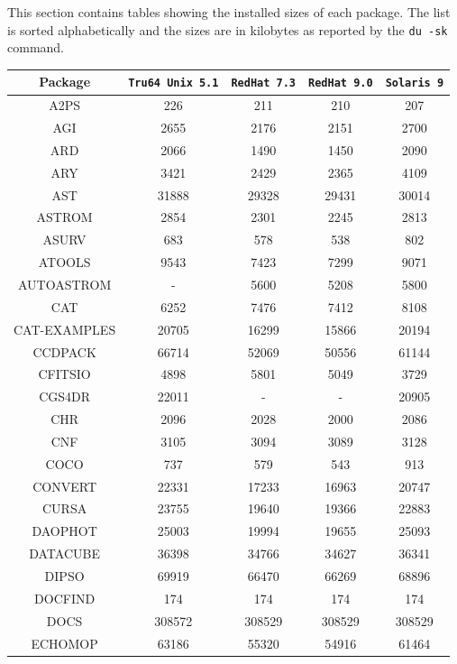 \documentclass[twoside,11pt]{article}
\renewcommand{\_}{\texttt{\symbol{95}}}
\begin{document}
This section contains tables showing the installed sizes of each
package.  The list is sorted alphabetically and the sizes are in
kilobytes as reported by the \texttt{du -sk} command.

\vspace*{10mm}

\begin{table}[ht]
\begin{center}
\begin{tabular}{|c|c|c|c|c|}
\hline \hline
\textbf{Package} & \texttt{Tru64 Unix 5.1} & \texttt{RedHat 7.3} & \texttt{RedHat 9.0} & \texttt{Solaris 9} \\ \hline \hline 
A2PS & 226 & 211 & 210 & 207 \\ 
AGI & 2655 & 2176 & 2151 & 2700 \\ 
ARD & 2066 & 1490 & 1450 & 2090 \\ 
ARY & 3421 & 2429 & 2365 & 4109 \\ 
AST & 31888 & 29328 & 29431 & 30014 \\ 
ASTROM & 2854 & 2301 & 2245 & 2813 \\ 
ASURV & 683 & 578 & 538 & 802 \\ 
ATOOLS & 9543 & 7423 & 7299 & 9071 \\ 
AUTOASTROM & - & 5600 & 5208 & 5800 \\ 
CAT & 6252 & 7476 & 7412 & 8108 \\ 
CAT-EXAMPLES & 20705 & 16299 & 15866 & 20194 \\ 
CCDPACK & 66714 & 52069 & 50556 & 61144 \\ 
CFITSIO & 4898 & 5801 & 5049 & 3729 \\ 
CGS4DR & 22011 & - & - & 20905 \\ 
CHR & 2096 & 2028 & 2000 & 2086 \\ 
CNF & 3105 & 3094 & 3089 & 3128 \\ 
COCO & 737 & 579 & 543 & 913 \\ 
CONVERT & 22331 & 17233 & 16963 & 20747 \\ 
CURSA & 23755 & 19640 & 19366 & 22883 \\ 
DAOPHOT & 25003 & 19994 & 19655 & 25093 \\ 
DATACUBE & 36398 & 34766 & 34627 & 36341 \\ 
DIPSO & 69919 & 66470 & 66269 & 68896 \\ 
DOCFIND & 174 & 174 & 174 & 174 \\ 
DOCS & 308572 & 308529 & 308529 & 308529 \\ 
ECHOMOP & 63186 & 55320 & 54916 & 61464 \\ 

\end{tabular}
\end{center}
\end{table}
\end{document}
